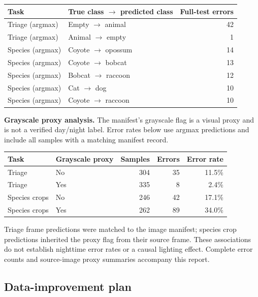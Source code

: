 \documentclass[11pt,a4paper]{article}
\begin{document}
\begin{center}
{\small
\begin{tabular}{llr}
\toprule
Task & True class $\rightarrow$ predicted class & Full-test errors \\
\midrule
Triage (argmax) & Empty $\rightarrow$ animal & 42 \\
Triage (argmax) & Animal $\rightarrow$ empty & 1 \\
Species (argmax) & Coyote $\rightarrow$ opossum & 14 \\
Species (argmax) & Coyote $\rightarrow$ bobcat & 13 \\
Species (argmax) & Bobcat $\rightarrow$ raccoon & 12 \\
Species (argmax) & Cat $\rightarrow$ dog & 10 \\
Species (argmax) & Coyote $\rightarrow$ raccoon & 10 \\
\bottomrule
\end{tabular}}
\end{center}

\textbf{Grayscale proxy analysis.} The manifest's grayscale flag is a visual proxy and is not a verified day/night label. Error rates below use argmax predictions and include all samples with a matching manifest record.

\begin{center}
{\small
\begin{tabular}{llrrr}
\toprule
Task & Grayscale proxy & Samples & Errors & Error rate \\
\midrule
Triage & No & 304 & 35 & 11.5\% \\
Triage & Yes & 335 & 8 & 2.4\% \\
Species crops & No & 246 & 42 & 17.1\% \\
Species crops & Yes & 262 & 89 & 34.0\% \\
\bottomrule
\end{tabular}}
\end{center}

Triage frame predictions were matched to the image manifest; species crop predictions inherited the proxy flag from their source frame. These associations do not establish nighttime error rates or a causal lighting effect. Complete error counts and source-image proxy summaries accompany this report.

\subsection{Data-improvement plan}
\end{document}
